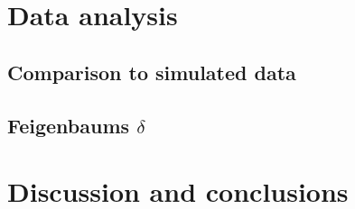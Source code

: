 \documentclass[12pt,oneside,a4paper]{article}
\numberwithin{equation}{section}
\begin{document}
{{{{\section{Data analysis}
\subsection{Comparison to simulated data}
\subsection{Feigenbaums $\delta$}
\section{Discussion and conclusions}
\newpage



\newpage
\appendix
}}}}
\end{document}
